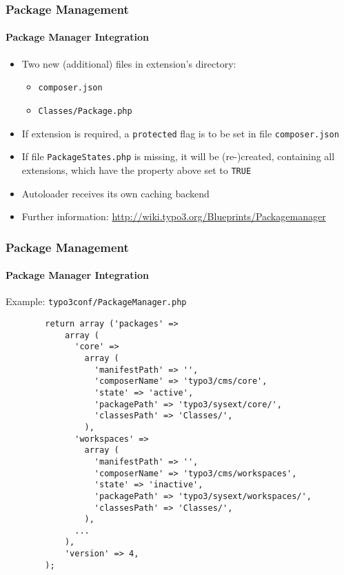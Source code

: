 \begin{frame}[fragile]
	\frametitle{Package Management}
	\framesubtitle{Package Manager Integration}

	\begin{itemize}

		\item Two new (additional) files in extension's directory:

			\begin{itemize}
				\item \texttt{composer.json}
				\item \texttt{Classes/Package.php}
			\end{itemize}

		\item If extension is required, a \texttt{protected} flag is to be set in file \texttt{composer.json}

		\item If file \texttt{PackageStates.php} is missing, it will be (re-)created,\newline
			containing all extensions, which have the property above set to \texttt{TRUE}

		\item Autoloader receives its own caching backend

		\item Further information:\newline
			\url{http://wiki.typo3.org/Blueprints/Packagemanager}

	\end{itemize}

\end{frame}


\begin{frame}[fragile]
	\frametitle{Package Management}
	\framesubtitle{Package Manager Integration}

	Example: \texttt{typo3conf/PackageManager.php}

	\lstset{
		basicstyle=\tiny\ttfamily
	}

	\begin{lstlisting}
		return array ('packages' =>
		    array (
		      'core' =>
		        array (
		          'manifestPath' => '',
		          'composerName' => 'typo3/cms/core',
		          'state' => 'active',
		          'packagePath' => 'typo3/sysext/core/',
		          'classesPath' => 'Classes/',
		        ),
		      'workspaces' =>
		        array (
		          'manifestPath' => '',
		          'composerName' => 'typo3/cms/workspaces',
		          'state' => 'inactive',
		          'packagePath' => 'typo3/sysext/workspaces/',
		          'classesPath' => 'Classes/',
		        ),
		      ...
		    ),
		    'version' => 4,
		);
	\end{lstlisting}

\end{frame}

